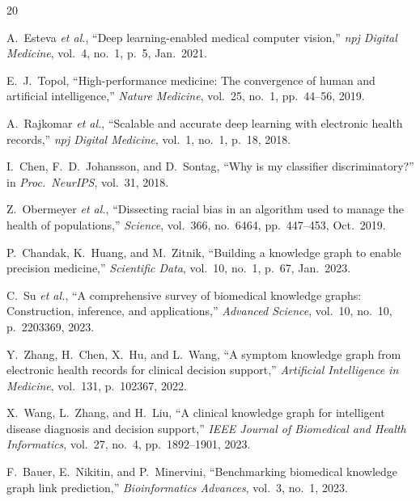 \documentclass[conference]{IEEEtran}
\begin{document}
\balance
\begin{thebibliography}{20}

A.~Esteva \textit{et al.},
``Deep learning-enabled medical computer vision,''
\textit{npj Digital Medicine}, vol.~4, no.~1, p.~5, Jan.~2021.

E.~J.~Topol,
``High-performance medicine: The convergence of human and artificial
intelligence,''
\textit{Nature Medicine}, vol.~25, no.~1, pp.~44--56, 2019.

A.~Rajkomar \textit{et al.},
``Scalable and accurate deep learning with electronic health records,''
\textit{npj Digital Medicine}, vol.~1, no.~1, p.~18, 2018.

I.~Chen, F.~D.~Johansson, and D.~Sontag,
``Why is my classifier discriminatory?''
in \textit{Proc.\ NeurIPS}, vol.~31, 2018.

Z.~Obermeyer \textit{et al.},
``Dissecting racial bias in an algorithm used to manage the health of
populations,''
\textit{Science}, vol.~366, no.~6464, pp.~447--453, Oct.~2019.

P.~Chandak, K.~Huang, and M.~Zitnik,
``Building a knowledge graph to enable precision medicine,''
\textit{Scientific Data}, vol.~10, no.~1, p.~67, Jan.~2023.

C.~Su \textit{et al.},
``A comprehensive survey of biomedical knowledge graphs: Construction,
inference, and applications,''
\textit{Advanced Science}, vol.~10, no.~10, p.~2203369, 2023.

Y.~Zhang, H.~Chen, X.~Hu, and L.~Wang,
``A symptom knowledge graph from electronic health records for clinical
decision support,''
\textit{Artificial Intelligence in Medicine}, vol.~131, p.~102367,
2022.

X.~Wang, L.~Zhang, and H.~Liu,
``A clinical knowledge graph for intelligent disease diagnosis and
decision support,''
\textit{IEEE Journal of Biomedical and Health Informatics}, vol.~27,
no.~4, pp.~1892--1901, 2023.

F.~Bauer, E.~Nikitin, and P.~Minervini,
``Benchmarking biomedical knowledge graph link prediction,''
\textit{Bioinformatics Advances}, vol.~3, no.~1, 2023.


\end{thebibliography}
\end{document}
